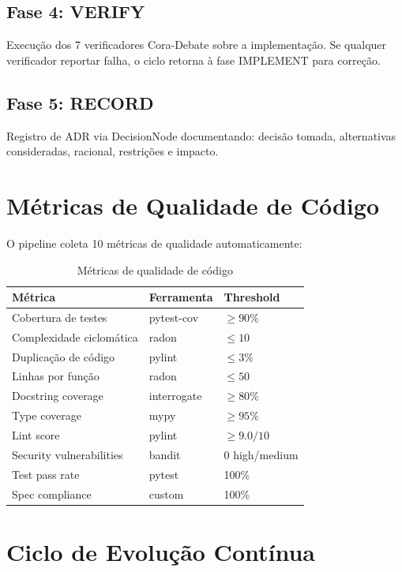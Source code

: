 \documentclass[12pt,a4paper,sumario=tradicional]{abntex2}
\begin{document}
\subsection{Fase 4: VERIFY}

Execução dos 7 verificadores Cora-Debate sobre a implementação. Se qualquer verificador reportar falha, o ciclo retorna à fase IMPLEMENT para correção.

\subsection{Fase 5: RECORD}

Registro de ADR via DecisionNode documentando: decisão tomada, alternativas consideradas, racional, restrições e impacto.

\section{Métricas de Qualidade de Código}

O pipeline coleta 10 métricas de qualidade automaticamente:

\begin{table}[H]
\centering
\caption{Métricas de qualidade de código}
\label{tab:code-quality}
\begin{tabular}{@{}lll@{}}
\toprule
\textbf{Métrica} & \textbf{Ferramenta} & \textbf{Threshold} \\
\midrule
Cobertura de testes & pytest-cov & $\geq 90\%$ \\
Complexidade ciclomática & radon & $\leq 10$ \\
Duplicação de código & pylint & $\leq 3\%$ \\
Linhas por função & radon & $\leq 50$ \\
Docstring coverage & interrogate & $\geq 80\%$ \\
Type coverage & mypy & $\geq 95\%$ \\
Lint score & pylint & $\geq 9.0/10$ \\
Security vulnerabilities & bandit & 0 high/medium \\
Test pass rate & pytest & 100\% \\
Spec compliance & custom & 100\% \\
\bottomrule
\end{tabular}
\end{table}

\section{Ciclo de Evolução Contínua}
\end{document}

